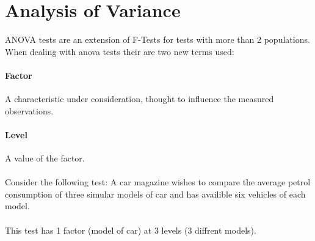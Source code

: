 \section{Analysis of Variance}
ANOVA tests are an extension of F-Tests for tests with more than 2 populations. When dealing with anova tests their are two new terms used:
\paragraph{Factor} A characteristic under consideration, thought to influence the measured observations.
\paragraph{Level} A value of the factor.\\
\\
Consider the following test:
A car magazine wishes to compare the average petrol consumption of three simular models of car and has availible six vehicles of each model. \\
\\
This test has 1 factor (model of car) at 3 levels (3 diffrent models).


